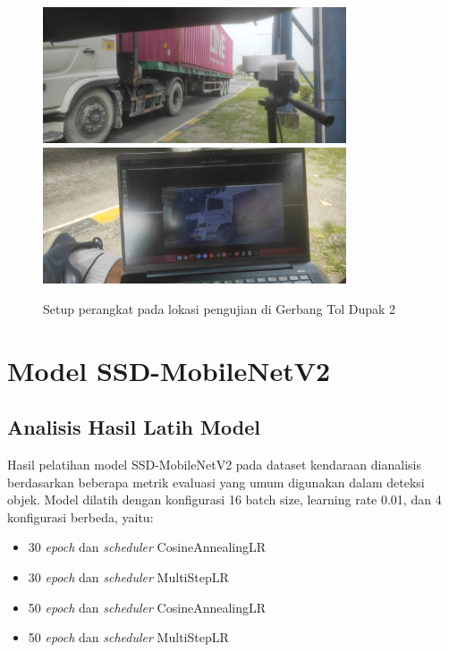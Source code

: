\begin{figure}[htbp]
  \centering
  \includegraphics[width=0.8\textwidth]{gambar/bab4-test-dupak-kamera.jpeg}
  \includegraphics[width=0.8\textwidth]{gambar/bab4-test-dupak-monitor.jpeg}
  \caption{Setup perangkat pada lokasi pengujian di Gerbang Tol Dupak 2}
  \label{fig:testing_environment}
\end{figure}

\section{Model SSD-MobileNetV2}
\label{sec:model_ssd_mobilenetv2}

\subsection{Analisis Hasil Latih Model}

Hasil pelatihan model SSD-MobileNetV2 pada dataset kendaraan dianalisis berdasarkan beberapa metrik evaluasi yang umum digunakan dalam deteksi objek. Model dilatih dengan konfigurasi 16 batch size, learning rate 0.01, dan 4 konfigurasi berbeda, yaitu:

\begin{itemize}[nolistsep]
  \item 30 \emph{epoch} dan \emph{scheduler} CosineAnnealingLR
  \item 30 \emph{epoch} dan \emph{scheduler} MultiStepLR
  \item 50 \emph{epoch} dan \emph{scheduler} CosineAnnealingLR
  \item 50 \emph{epoch} dan \emph{scheduler} MultiStepLR
\end{itemize}\

